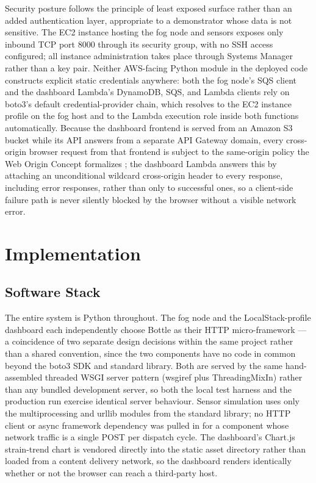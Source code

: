 \documentclass[conference]{IEEEtran}
\begin{document}
Security posture follows the principle of least exposed surface rather than an added authentication layer, appropriate to a demonstrator whose data is not sensitive. The EC2 instance hosting the fog node and sensors exposes only inbound TCP port 8000 through its security group, with no SSH access configured; all instance administration takes place through Systems Manager rather than a key pair. Neither AWS-facing Python module in the deployed code constructs explicit static credentials anywhere: both the fog node's SQS client and the dashboard Lambda's DynamoDB, SQS, and Lambda clients rely on boto3's default credential-provider chain, which resolves to the EC2 instance profile on the fog host and to the Lambda execution role inside both functions automatically. Because the dashboard frontend is served from an Amazon S3 bucket while its API answers from a separate API Gateway domain, every cross-origin browser request from that frontend is subject to the same-origin policy the Web Origin Concept formalizes \cite{ref9}; the dashboard Lambda answers this by attaching an unconditional wildcard cross-origin header to every response, including error responses, rather than only to successful ones, so a client-side failure path is never silently blocked by the browser without a visible network error.

\section{Implementation}

\subsection{Software Stack}

The entire system is Python throughout. The fog node and the LocalStack-profile dashboard each independently choose Bottle as their HTTP micro-framework --- a coincidence of two separate design decisions within the same project rather than a shared convention, since the two components have no code in common beyond the boto3 SDK and standard library. Both are served by the same hand-assembled threaded WSGI server pattern (wsgiref plus ThreadingMixIn) rather than any bundled development server, so both the local test harness and the production run exercise identical server behaviour. Sensor simulation uses only the multiprocessing and urllib modules from the standard library; no HTTP client or async framework dependency was pulled in for a component whose network traffic is a single POST per dispatch cycle. The dashboard's Chart.js strain-trend chart is vendored directly into the static asset directory rather than loaded from a content delivery network, so the dashboard renders identically whether or not the browser can reach a third-party host.
\end{document}
